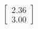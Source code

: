 \documentclass[preview]{standalone}
\begin{document}
\begin{align*}
\begin{bmatrix} 2.36 \\ 3.00 \end{bmatrix}
\end{align*}
\end{document}
